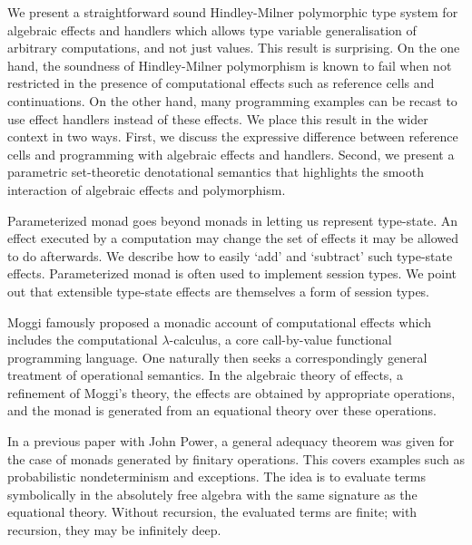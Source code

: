 \documentclass[a4paper,UKenglish]{dagrep}
\begin{document}
We present a straightforward sound Hindley-Milner polymorphic type system for algebraic effects and handlers which allows type variable generalisation of arbitrary computations, and not just values. This result is surprising. On the one hand, the soundness of Hindley-Milner polymorphism is known to fail when not restricted in the presence of computational effects such as reference cells and continuations. On the other hand, many programming examples can be recast to use effect handlers instead of these effects. We place this result in the wider context in two ways. First, we discuss the expressive difference between reference cells and programming with algebraic effects and handlers. Second, we present a parametric set-theoretic denotational semantics that highlights the smooth interaction of algebraic effects and polymorphism.

\license

Parameterized monad goes beyond monads in letting us represent
type-state. An effect executed by a computation may change the
set of effects it may be allowed to do afterwards. We describe
how to easily `add' and `subtract' such type-state
effects. Parameterized monad is often used to implement session
types. We point out that extensible type-state effects are
themselves a form of session types.

\license

Moggi famously proposed a monadic account of computational effects which includes the computational $\lambda$-calculus, a core call-by-value functional programming language. One naturally then seeks  a correspondingly general treatment of operational semantics. In the algebraic theory of effects, a refinement of Moggi’s theory, the effects are obtained by appropriate operations, and the monad is  generated from an equational theory over these operations.

 In a previous paper with John Power,  a general adequacy theorem was given  for the case of monads generated by finitary operations. This covers examples such as probabilistic nondeterminism and exceptions. The  idea is to evaluate terms symbolically in the absolutely free algebra with the same signature as the equational theory. Without recursion, the evaluated terms are finite; with recursion, they may be infinitely deep.
\end{document}

